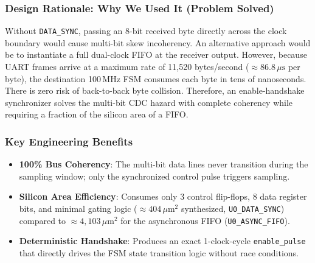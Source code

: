 \documentclass[11pt,a4paper]{article}
\begin{document}
\subsubsection{Design Rationale: Why We Used It (Problem Solved)}
Without \texttt{DATA\_SYNC}, passing an 8-bit received byte directly across the clock boundary would cause multi-bit skew incoherency. An alternative approach would be to instantiate a full dual-clock FIFO at the receiver output. However, because UART frames arrive at a maximum rate of 11,520 bytes/second ($\approx 86.8\,\mu\text{s}$ per byte), the destination 100\,MHz FSM consumes each byte in tens of nanoseconds. There is zero risk of back-to-back byte collision. Therefore, an enable-handshake synchronizer solves the multi-bit CDC hazard with complete coherency while requiring a fraction of the silicon area of a FIFO.

\subsubsection{Key Engineering Benefits}
\begin{itemize}
    \item \textbf{100\% Bus Coherency}: The multi-bit data lines never transition during the sampling window; only the synchronized control pulse triggers sampling.
    \item \textbf{Silicon Area Efficiency}: Consumes only 3 control flip-flops, 8 data register bits, and minimal gating logic ($\approx 404\,\mu\text{m}^2$ synthesized, \texttt{U0\_DATA\_SYNC}) compared to $\approx 4{,}103\,\mu\text{m}^2$ for the asynchronous FIFO (\texttt{U0\_ASYNC\_FIFO}).
    \item \textbf{Deterministic Handshake}: Produces an exact 1-clock-cycle \texttt{enable\_pulse} that directly drives the FSM state transition logic without race conditions.
\end{itemize}
\end{document}
